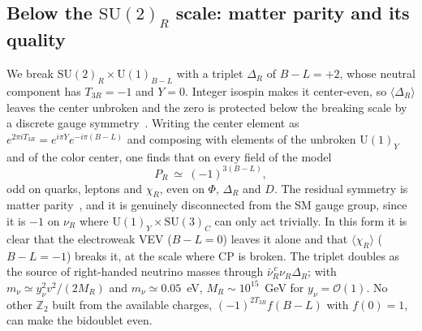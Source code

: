 \documentclass[submission, Phys]{SciPost}
\newcommand{\SU}{\mathrm{SU}}
\newcommand{\U}{\mathrm{U}}
\newcommand{\Z}{\mathbb{Z}}
\newcommand{\Ord}{\mathcal{O}}
\newcommand{\PR}{P_R}
\newcommand{\vev}[1]{\langle #1\rangle}
\begin{document}
\subsection{Below the $\SU(2)_R$ scale: matter parity and its quality}
\label{sec:layer3}

We break $\SU(2)_R\times\U(1)_{B-L}$ with a triplet $\Delta_R$ of
$B-L=+2$, whose neutral component has $T_{3R}=-1$ and $Y=0$. Integer
isospin makes it center-even, so $\vev{\Delta_R}$ leaves the center
unbroken and the zero is protected below the breaking scale by a
discrete gauge symmetry~\cite{krauss_1989:PRL}. Writing the center
element as $e^{2\pi iT_{3R}}=e^{i\pi Y}e^{-i\pi(B-L)}$ and composing
with elements of the unbroken $\U(1)_Y$ and of the color center, one
finds that on every field of the model
\begin{equation}
  \PR\ \simeq\ (-1)^{3(B-L)} ,
  \label{eq:matterparity}
\end{equation}
odd on quarks, leptons and $\chi_R$, even on $\Phi$, $\Delta_R$ and $D$.
The residual symmetry is matter parity~\cite{Ibanez:1991hv,Martin:1992mq},
and it is genuinely disconnected from the SM gauge group, since it is
$-1$ on $\nu_R$ where $\U(1)_Y\times\SU(3)_C$ can only act trivially.
In this form it is clear that the electroweak VEV ($B-L=0$) leaves it
alone and that $\vev{\chi_R}$ ($B-L=-1$) breaks it, at the scale where
CP is broken. The triplet doubles as the source of right-handed
neutrino masses through $\bar\nu_R^{\,c}\nu_R\Delta_R$; with
$m_\nu\simeq y_\nu^2v^2/(2M_R)$ and $m_\nu\simeq0.05$~eV, $M_R\sim10^{15}$~GeV
for $y_\nu=\Ord(1)$. No other $\Z_2$ built from the available charges,
$(-1)^{2T_{3R}}f(B-L)$ with $f(0)=1$, can make the bidoublet even.
\end{document}
